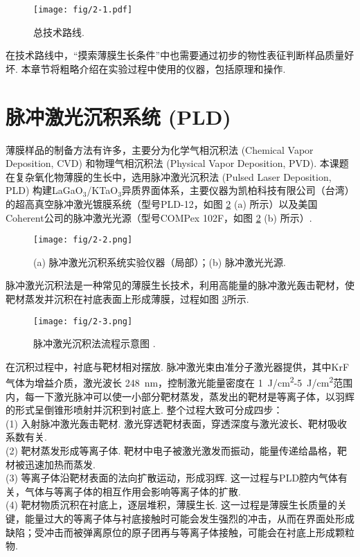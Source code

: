 \documentclass[12pt,a4paper,openany,twoside,UTF-8]{book}
\begin{document}
\begin{figure}[htbp]
\centering
\texttt{[image: fig/2-1.pdf]}
\caption{总技术路线.}
\label{fig:2-1} 
\end{figure}

在技术路线中，“摸索薄膜生长条件”中也需要通过初步的物性表征判断样品质量好坏. 本章节将粗略介绍在实验过程中使用的仪器，包括原理和操作.
\section{脉冲激光沉积系统 (PLD)}
薄膜样品的制备方法有许多，主要分为化学气相沉积法 (Chemical Vapor Deposition, CVD) 和物理气相沉积法 (Physical Vapor Deposition, PVD). 本课题在复杂氧化物薄膜的生长中，选用脉冲激光沉积法 (Pulsed Laser Deposition, PLD) 构建LaGaO$_3$/KTaO$_3$异质界面体系，主要仪器为凯柏科技有限公司（台湾）的超高真空脉冲激光镀膜系统（型号PLD-12，如图 \ref{fig:2-2} (a) 所示）以及美国Coherent公司的脉冲激光光源（型号COMPex 102F，如图 \ref{fig:2-2} (b) 所示）.

\begin{figure}[htbp]
\centering
\texttt{[image: fig/2-2.png]}
\caption{(a) 脉冲激光沉积系统实验仪器（局部）；(b) 脉冲激光光源.}
\label{fig:2-2} 
\end{figure}

脉冲激光沉积法是一种常见的薄膜生长技术，利用高能量的脉冲激光轰击靶材，使靶材蒸发并沉积在衬底表面上形成薄膜，过程如图 \ref{fig:2-3}所示. 

\begin{figure}[htbp]
\centering
\texttt{[image: fig/2-3.png]}
\caption{脉冲激光沉积法流程示意图 \cite{ref23}.}
\label{fig:2-3} 
\end{figure}

在沉积过程中，衬底与靶材相对摆放. 脉冲激光束由准分子激光器提供，其中KrF气体为增益介质，激光波长 \SI{248}{nm}，控制激光能量密度在 \SI{1}{J/cm^2}-\SI{5}{J/cm^2}范围内，每一下激光脉冲可以使一小部分靶材蒸发，蒸发出的靶材是等离子体，以羽辉的形式呈倒锥形喷射并沉积到衬底上. 整个过程大致可分成四步：\\
(1) 入射脉冲激光轰击靶材. 激光穿透靶材表面，穿透深度与激光波长、靶材吸收系数有关.\\
(2) 靶材蒸发形成等离子体. 靶材中电子被激光激发而振动，能量传递给晶格，靶材被迅速加热而蒸发.\\
(3) 等离子体沿靶材表面的法向扩散运动，形成羽辉. 这一过程与PLD腔内气体有关，气体与等离子体的相互作用会影响等离子体的扩散.\\
(4) 靶材物质沉积在衬底上，逐层堆积，薄膜生长. 这一过程是薄膜生长质量的关键，能量过大的等离子体与衬底接触时可能会发生强烈的冲击，从而在界面处形成缺陷；受冲击而被弹离原位的原子团再与等离子体接触，可能会在衬底上形成颗粒物.
\end{document}
